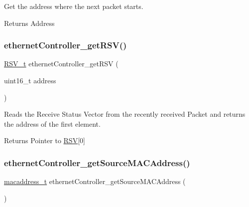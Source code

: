 Get the address where the next packet starts. 

\begin{DoxyReturn}{Returns}
Address 
\end{DoxyReturn}
\mbox{\label{group__data__reception_ga1d8cfd56b6020b891ba408c18789129c}} 
\subsubsection{\texorpdfstring{ethernetController\_getRSV()}{ethernetController\_getRSV()}}
{\footnotesize\ttfamily \mbox{\hyperlink{group__rsv_gaf7fd94a9424fccb0aafa846f27a43099}{R\+S\+V\+\_\+t}} ethernet\+Controller\+\_\+get\+R\+SV (\begin{DoxyParamCaption}\item[{uint16\+\_\+t}]{address }\end{DoxyParamCaption})}



Reads the Receive Status Vector from the recently received Packet and returns the address of the first element. 

\begin{DoxyReturn}{Returns}
Pointer to \mbox{\hyperlink{struct_r_s_v}{R\+SV}}\mbox{[}0\mbox{]} 
\end{DoxyReturn}
\mbox{\label{group__data__reception_gaa299c646a9c07c0ee81e8c673acd56b2}} 
\subsubsection{\texorpdfstring{ethernetController\_getSourceMACAddress()}{ethernetController\_getSourceMACAddress()}}
{\footnotesize\ttfamily \mbox{\hyperlink{group__ethernet_gacb865bcbf50a6c8cef05581bfabff373}{macaddress\+\_\+t}} ethernet\+Controller\+\_\+get\+Source\+M\+A\+C\+Address (\begin{DoxyParamCaption}{ }\end{DoxyParamCaption})}



